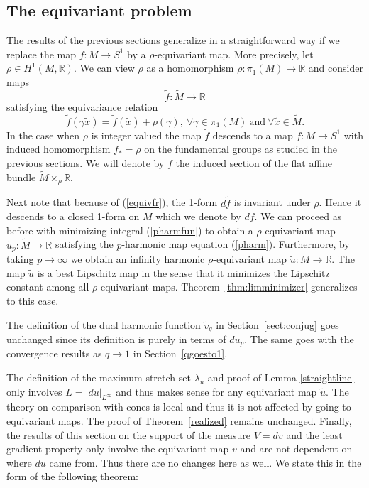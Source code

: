 \documentclass{ip-journal}
\theoremstyle{definition}
\numberwithin{equation}{section}
\newcommand{\R}{\mathbb R}
\begin{document}
\subsection{The equivariant problem}\label{sectevp} The results of the previous sections generalize in a straightforward way if we replace the map $f: M \rightarrow S^1$ by a 
$\rho$-equivariant map. 
More precisely, let $\rho \in H^1(M, \R)$. We can view $\rho$ as a homomorphism $\rho: \pi_1(M) \rightarrow \R$ and consider maps 
\[
\tilde f: \tilde M \rightarrow \R
\] 
satisfying the equivariance relation
\begin{equation}\label{equivfr}
\tilde f(\gamma \tilde x)=  \tilde f( \tilde x)+ \rho(\gamma), \ \forall \gamma \in \pi_1(M)\  \mbox{and} \   \forall \tilde x \in \tilde M. 
\end{equation}
In the case when $\rho$ is integer valued the map $\tilde f$ descends to a map $f:M \rightarrow S^1$ with induced homomorphism $f_*=\rho$ on the fundamental groups as studied in the previous sections. We will denote by $f$ the induced section of the flat affine bundle
$\tilde M \times_\rho \R$.

Next note that because of (\ref{equivfr}), the 1-form $d\tilde f$ is invariant under $\rho$. Hence it descends to a closed 1-form on $M$ which we denote by $df$.  We can proceed as before with minimizing  integral (\ref{pharmfun}) to obtain a $\rho$-equivariant map $\tilde u_p: \tilde M \rightarrow \R$ satisfying the $p$-harmonic map equation (\ref{pharm}). Furthermore, by taking $p \rightarrow \infty$ we obtain an infinity harmonic $\rho$-equivariant map $\tilde u: \tilde M \rightarrow \R$.  The map $\tilde u$ is a best Lipschitz map in the sense that it minimizes the Lipschitz constant among all $\rho$-equivariant maps. Theorem~\ref{thm:limminimizer} generalizes to this case.

The definition of the dual harmonic function $\tilde v_q$ in Section~\ref{sect:conjug} goes unchanged since its definition is purely in terms of $du_p$. The same goes with the convergence results as $q \rightarrow 1$ in Section~\ref{qgoesto1}.

The definition of the maximum stretch set $\lambda_u$ and proof of Lemma \ref{straightline} only involves $L=|du|_{L^\infty}$ and thus makes sense for any equivariant map $\tilde u$. The theory on comparison with cones is local and thus it is not affected by going to equivariant maps.  The proof of Theorem~\ref{realized} remains unchanged. Finally, the results of this section on the support of the measure $V=dv$ and the least gradient property only involve the equivariant map $v$ and are not dependent on where $du$ came from. Thus there are no changes here as well. We state this in the form of the following theorem:
\end{document}
